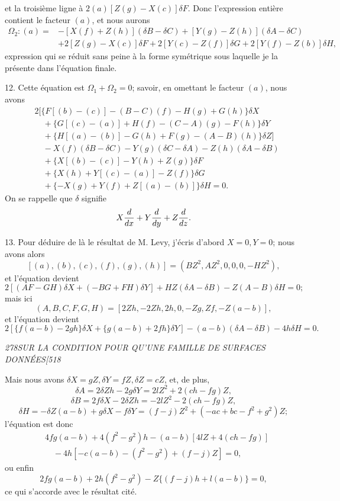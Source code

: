 \documentclass[11pt]{article}
\newcommand{\phead}[3]{\noindent\textit{#1\hfill #2\hfill #3}\par\medskip}
\newcommand{\D}{\delta}
\begin{document}
et la troisi\`eme ligne \`a $2(a)[Z(g)-X(c)]\D F$. Donc l'expression enti\`ere contient le
facteur $(a)$, et nous aurons
\[
\begin{split}
\Omega_2:(a)={}&-[X(f)+Z(h)](\D B-\D C)+[Y(g)-Z(h)](\D A-\D C)\\
&+2[Z(g)-X(c)]\D F+2[Y(c)-Z(f)]\D G+2[Y(f)-Z(b)]\D H,
\end{split}
\]
expression qui se r\'eduit sans peine \`a la forme sym\'etrique sous laquelle je la pr\'esente
dans l'\'equation finale.

12. Cette \'equation est $\Omega_1+\Omega_2=0$; savoir, en omettant le facteur $(a)$,
nous avons
\[
\begin{split}
&2[\{F[(b)-(c)]-(B-C)(f)-H(g)+G(h)\}\D X\\
&\quad+\{G[(c)-(a)]+H(f)-(C-A)(g)-F(h)\}\D Y\\
&\quad+\{H[(a)-(b)]-G(h)+F(g)-(A-B)(h)\}\D Z]\\
&\quad-X(f)(\D B-\D C)-Y(g)(\D C-\D A)-Z(h)(\D A-\D B)\\
&\quad+\{X[(b)-(c)]-Y(h)+Z(g)\}\D F\\
&\quad+\{X(h)+Y[(c)-(a)]-Z(f)\}\D G\\
&\quad+\{-X(g)+Y(f)+Z[(a)-(b)]\}\D H=0.
\end{split}
\]
On se rappelle que $\D$ signifie
\[
X{d\over dx}+Y{d\over dy}+Z{d\over dz}.
\]

13. Pour d\'eduire de l\`a le r\'esultat de M. Levy, j'\'ecris d'abord $X=0,Y=0$; nous
avons alors
\[
[(a),(b),(c),(f),(g),(h)]=(BZ^2,AZ^2,0,0,0,-HZ^2),
\]
et l'\'equation devient
\[
2[(AF-GH)\D X+(-BG+FH)\D Y]+HZ(\D A-\D B)-Z(A-B)\D H=0;
\]
mais ici
\[
(A,B,C,F,G,H)=[2Zh,-2Zh,2h,0,-Zg,Zf,-Z(a-b)],
\]
et l'\'equation devient
\[
2[\{f(a-b)-2gh\}\D X+\{g(a-b)+2fh\}\D Y]
-(a-b)(\D A-\D B)-4h\D H=0.
\]

\clearpage

\phead{278}{SUR LA CONDITION POUR QU'UNE FAMILLE DE SURFACES DONN\'EES}{[518}

Mais nous avons $\D X=gZ,\D Y=fZ,\D Z=cZ$, et, de plus,
\[
\D A=2\D Zh-2g\D Y=2lZ^2+2(ch-fg)Z,
\]
\[
\D B=2f\D X-2\D Zh=-2lZ^2-2(ch-fg)Z,
\]
\[
\D H=-\D Z(a-b)+g\D X-f\D Y=(f-j)Z^2+(-ac+bc-f^2+g^2)Z;
\]
l'\'equation est donc
\[
\begin{split}
&4fg(a-b)+4(f^2-g^2)h-(a-b)[4lZ+4(ch-fg)]\\
&\quad-4h[-c(a-b)-(f^2-g^2)+(f-j)Z]=0,
\end{split}
\]
ou enfin
\[
2fg(a-b)+2h(f^2-g^2)-Z\{(f-j)h+l(a-b)\}=0,
\]
ce qui s'accorde avec le r\'esultat cit\'e.
\end{document}
